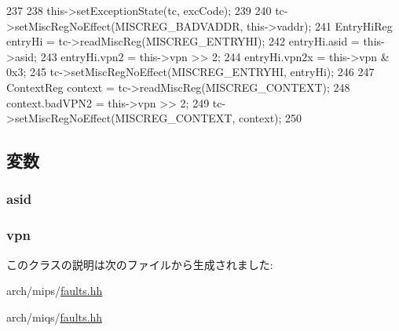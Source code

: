 \begin{DoxyCode}
237     {
238         this->setExceptionState(tc, excCode);
239 
240         tc->setMiscRegNoEffect(MISCREG_BADVADDR, this->vaddr);
241         EntryHiReg entryHi = tc->readMiscReg(MISCREG_ENTRYHI);
242         entryHi.asid = this->asid;
243         entryHi.vpn2 = this->vpn >> 2;
244         entryHi.vpn2x = this->vpn & 0x3;
245         tc->setMiscRegNoEffect(MISCREG_ENTRYHI, entryHi);
246 
247         ContextReg context = tc->readMiscReg(MISCREG_CONTEXT);
248         context.badVPN2 = this->vpn >> 2;
249         tc->setMiscRegNoEffect(MISCREG_CONTEXT, context);
250     }
\end{DoxyCode}


\subsection{変数}
\hypertarget{classMipsISA_1_1TlbFault_a3bd75b410169a5c0e356fda4d021e49c}{
\subsubsection[{asid}]{ {\bf asid}}}
\label{classMipsISA_1_1TlbFault_a3bd75b410169a5c0e356fda4d021e49c}
\hypertarget{classMipsISA_1_1TlbFault_ad378f7d20675898b2a5994600528fa9a}{
\subsubsection[{vpn}]{ {\bf vpn}}}
\label{classMipsISA_1_1TlbFault_ad378f7d20675898b2a5994600528fa9a}


このクラスの説明は次のファイルから生成されました:\begin{DoxyCompactItemize}
\item 
arch/mips/\hyperlink{arch_2mips_2faults_8hh}{faults.hh}\item 
arch/miqs/\hyperlink{arch_2miqs_2faults_8hh}{faults.hh}\end{DoxyCompactItemize}
